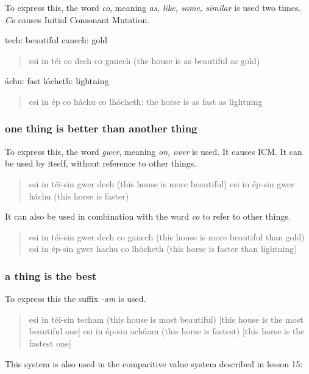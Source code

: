 To express this, the word \textit{co}, meaning \textit{as, like, same, similar} is used two times. \textit{Co} causes Initial Consonant Mutation.

tech: beautiful
canech: gold
\begin{quote}
esi in t\'{e}i co dech co ganech (the house is as beautiful as gold)
\end{quote}

\'{a}chu: fast
l\'{o}cheth: lightning
\begin{quote}
esi in \'{e}p co h\'{a}chu co lh\'{o}cheth: the horse is as fast as lightning
\end{quote}

\subsubsection{one thing is better than another thing}

To express this, the word \textit{gwer}, meaning \textit{on, over} is used. It causes ICM. It can be used by itself, without reference to other things.

\begin{quote}
esi in t\'{e}i-sin gwer dech (this house is more beautiful)
esi in \'{e}p-sin gwer h\'{a}chu (this horse is faster)
\end{quote}

It can also be used in combination with the word \textit{co} to refer to other things.

\begin{quote}
esi in t\'{e}i-sin gwer dech co ganech (this house is more beautiful than gold)
esi in \'{e}p-sin gwer hachu co lh\'{o}cheth (this horse is faster than lightning)
\end{quote}

\subsubsection{a thing is the best}

To express this the suffix \textit{-am} is used.

\begin{quote}
esi in t\'{e}i-sin techam (this house is most beautiful) [this house is the most beautiful one]
esi in \'{e}p-sin ach\'{u}am (this horse is fastest) [this horse is the fastest one]
\end{quote}

This system is also used in the comparitive value system described in lesson 15:

